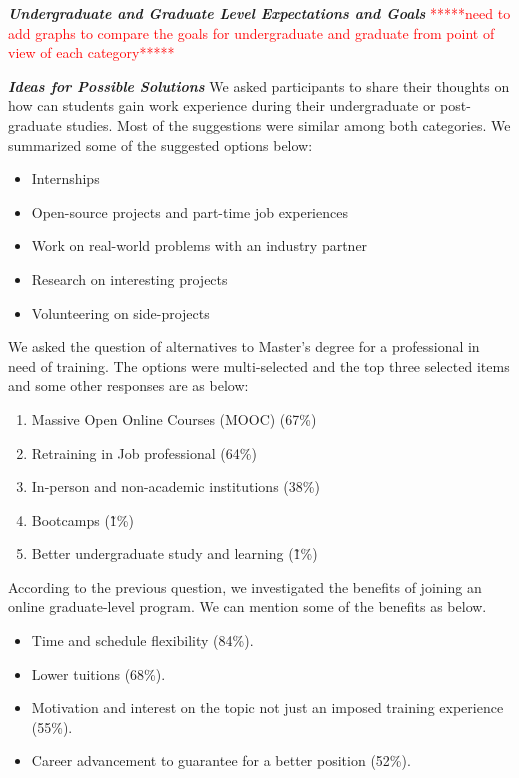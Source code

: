 \documentclass{sigchi}
\begin{document}
\textit{\textbf{Undergraduate and Graduate Level Expectations and Goals}}\newline
\textcolor{red}{*****need to add graphs to compare the goals for undergraduate and graduate from point of view of each category*****}


\textit{\textbf{Ideas for Possible Solutions}}\newline
We asked participants to share their thoughts on how can students gain work experience during their undergraduate or post-graduate studies. Most of the suggestions were similar among both categories. We summarized some of the suggested options below:
\begin{itemize}
	\item Internships
	\item Open-source projects and part-time job experiences
	\item Work on real-world problems with an industry partner
	\item Research on interesting projects
	\item Volunteering on side-projects
\end{itemize}

We asked the question of alternatives to Master's degree for a professional in need of training.  The options were multi-selected and the top three selected items and some other responses are as below:
\begin{enumerate}
	\item Massive Open Online Courses (MOOC) (67\%)
	\item Retraining in Job professional (64\%)
	\item In-person and non-academic institutions (38\%)
	\item Bootcamps (\~ 1\%)
	\item Better undergraduate study and learning (\~ 1\%)
\end{enumerate}

According to the previous question, we investigated the benefits of joining an online graduate-level program. We can mention some of the benefits as below.
\begin{itemize}
	\item Time and schedule flexibility (84\%).
	\item Lower tuitions (68\%).
	\item Motivation and interest on the topic not just an imposed training experience (55\%).
	\item Career advancement to guarantee for a better position (52\%).
\end{itemize}
\end{document}
